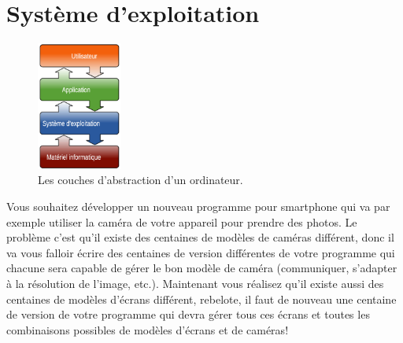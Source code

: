 
%

\section{Système d'exploitation}
\begin{figure}
	\centering
	\includegraphics[trim=0 0 0 0,width=0.25\textwidth]{Images/ordinateur/systemeexploitation}
	\caption{Les couches d'abstraction d'un ordinateur.}
\end{figure}
Vous souhaitez développer un nouveau programme pour smartphone qui va par exemple utiliser la caméra de votre appareil pour prendre des photos. Le problème c'est qu'il existe des centaines de modèles de caméras différent, donc il va vous falloir écrire des centaines de version différentes de votre programme qui chacune sera capable de gérer le bon modèle de caméra (communiquer, s'adapter à la résolution de l'image, etc.). Maintenant vous réalisez qu'il existe aussi des centaines de modèles d'écrans différent, rebelote, il faut de nouveau une centaine de version de votre programme qui devra gérer tous ces écrans et toutes les combinaisons possibles de modèles d'écrans et de caméras!\\

